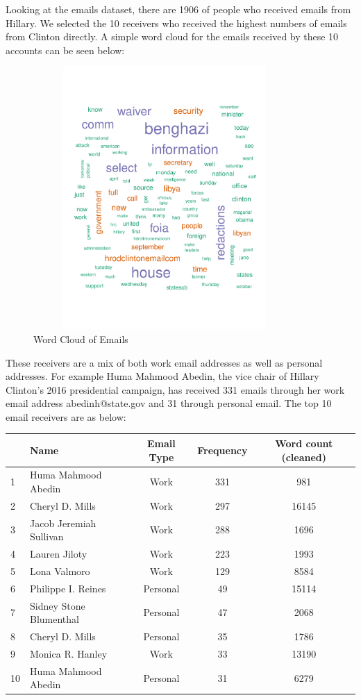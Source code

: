 Looking at the emails dataset, there are 1906 of people who received emails from Hillary. We selected the 10 receivers who received the highest numbers of emails from Clinton directly.
A simple word cloud for the emails received by these 10 accounts can be seen below:
\begin{figure}[h!]
    \centering
    \includegraphics[width=10cm,height=10cm]
    {wcloud.pdf}
    \caption{Word Cloud of Emails}
\end{figure}

These receivers are a mix of both work email addresses as well as personal addresses. For example Huma Mahmood Abedin, the vice chair of Hillary Clinton's 2016 presidential campaign, has received 331 emails through her work email address abedinh@state.gov and 31 through personal email. 
The top 10 email receivers are as below:
\begin{center}
  \begin{tabular}{ |l| l | c | c |c|}
    \hline
    &Name & Email Type & Frequency & Word count (cleaned)\\ \hline
    1&Huma Mahmood Abedin & Work & 331 & 981 \\ \hline
    2&Cheryl D. Mills & Work & 297 &16145 \\ \hline
    3&Jacob Jeremiah Sullivan & Work & 288 & 1696\\ \hline
    4&Lauren Jiloty & Work & 223 &1993\\ \hline
    5&Lona Valmoro & Work & 129 &8584\\ \hline
    6&Philippe I. Reines & Personal & 49 &15114\\ \hline
    7&Sidney Stone Blumenthal & Personal & 47 &2068\\ \hline
    8&Cheryl D. Mills & Personal & 35 &1786\\ \hline
    9&Monica R. Hanley & Work & 33 &13190\\ \hline
    10&Huma Mahmood Abedin & Personal & 31&6279 \\
    \hline
  \end{tabular}
\end{center}
\\

